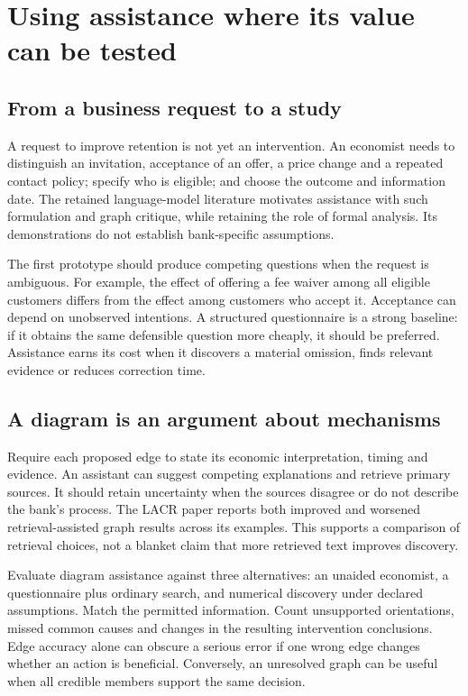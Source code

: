 \chapter{Using assistance where its value can be tested}
\label{scisyn:assistance}

\section{From a business request to a study}
A request to improve retention is not yet an intervention. An economist needs
to distinguish an invitation, acceptance of an offer, a price change and a
repeated contact policy; specify who is eligible; and choose the outcome and
information date. The retained language-model literature motivates assistance
with such formulation and graph critique, while retaining the role of formal
analysis. Its demonstrations do not establish bank-specific assumptions.
\citep{v12_la_2305_00050,v12_la_2606_23608}

The first prototype should produce competing questions when the request is
ambiguous. For example, the effect of offering a fee waiver among all eligible
customers differs from the effect among customers who accept it. Acceptance
can depend on unobserved intentions. A structured questionnaire is a strong
baseline: if it obtains the same defensible question more cheaply, it should
be preferred. Assistance earns its cost when it discovers a material omission,
finds relevant evidence or reduces correction time.

\section{A diagram is an argument about mechanisms}
Require each proposed edge to state its economic interpretation, timing and
evidence. An assistant can suggest competing explanations and retrieve primary
sources. It should retain uncertainty when the sources disagree or do not
describe the bank's process. The LACR paper reports both improved and worsened
retrieval-assisted graph results across its examples. This supports a comparison
of retrieval choices, not a blanket claim that more retrieved text improves
discovery.
\citep{v12_la_2402_15301}

Evaluate diagram assistance against three alternatives: an unaided economist,
a questionnaire plus ordinary search, and numerical discovery under declared
assumptions. Match the permitted information. Count unsupported orientations,
missed common causes and changes in the resulting intervention conclusions.
Edge accuracy alone can obscure a serious error if one wrong edge changes
whether an action is beneficial. Conversely, an unresolved graph can be useful
when all credible members support the same decision.

